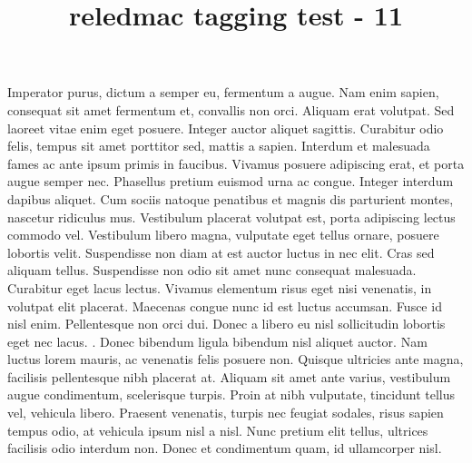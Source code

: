 \documentclass{article}
\title{reledmac tagging test - 11}
\begin{document}
\beginnumbering
\pstart
Imperator purus, dictum a semper eu, fermentum a augue. Nam enim sapien, consequat sit amet fermentum et, convallis non orci. Aliquam erat volutpat. Sed laoreet vitae enim eget posuere. Integer auctor aliquet sagittis. Curabitur odio felis, tempus sit amet porttitor sed, mattis a sapien. Interdum et malesuada fames ac ante ipsum primis in faucibus. Vivamus posuere adipiscing erat, et porta augue semper nec.
\pend
\pstart
Phasellus pretium euismod urna ac congue. Integer interdum dapibus aliquet. Cum sociis natoque penatibus et magnis dis parturient montes, nascetur ridiculus mus. Vestibulum placerat volutpat est, porta adipiscing lectus commodo vel. Vestibulum libero magna, vulputate eget tellus ornare, posuere lobortis velit. Suspendisse non diam at est auctor luctus in nec elit. Cras sed aliquam tellus. Suspendisse non odio sit amet nunc consequat malesuada. Curabitur eget lacus lectus. Vivamus elementum risus eget nisi venenatis, in volutpat elit placerat. Maecenas congue nunc id est luctus accumsan. Fusce id nisl enim.
\pend
\pstart
Pellentesque non orci dui. Donec a libero eu nisl sollicitudin lobortis eget nec lacus. . Donec bibendum ligula bibendum nisl aliquet auctor. Nam luctus lorem mauris, ac venenatis felis posuere non. Quisque ultricies ante magna, facilisis pellentesque nibh placerat at. Aliquam sit amet ante varius, vestibulum augue condimentum, scelerisque turpis. Proin at nibh vulputate, tincidunt tellus vel, vehicula libero. Praesent venenatis, turpis nec feugiat sodales, risus sapien tempus odio, at vehicula ipsum nisl a nisl. Nunc pretium elit tellus, ultrices facilisis odio interdum non. Donec et condimentum quam, id ullamcorper nisl.
\pend
\endnumbering

\newpage
\printindex

\printindex[name]
\end{document}
